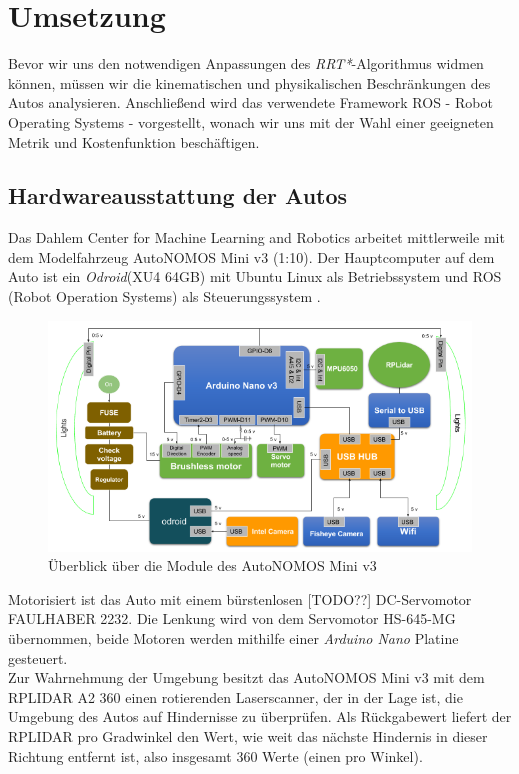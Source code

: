 \section{Umsetzung}
\label{Umsetzung}
Bevor wir uns den notwendigen Anpassungen des \textit{RRT*}-Algorithmus widmen können, müssen wir die kinematischen und physikalischen Beschränkungen des Autos analysieren. Anschließend wird das verwendete Framework ROS - Robot Operating Systems - vorgestellt, wonach wir uns mit der Wahl einer geeigneten Metrik und Kostenfunktion beschäftigen.
\subsection{Hardwareausstattung der Autos}
Das Dahlem Center for Machine Learning and Robotics arbeitet mittlerweile mit dem Modelfahrzeug AutoNOMOS Mini v3 (1:10). Der Hauptcomputer auf dem Auto ist ein \textit{Odroid}(XU4 64GB) mit Ubuntu Linux als Betriebssystem und ROS (Robot Operation Systems) als Steuerungssystem \citep{fubAuto}.\\
\begin{figure}
\centering
\includegraphics[scale=0.8]{Bilder/AutoNOMOS_mini_v3.png} 
\caption{Überblick über die Module des AutoNOMOS Mini v3}
\end{figure}
Motorisiert ist das Auto mit einem bürstenlosen [TODO??] DC-Servomotor FAULHABER 2232. Die Lenkung wird von dem Servomotor HS-645-MG übernommen, beide Motoren werden mithilfe einer \textit{Arduino Nano} Platine gesteuert. \\
Zur Wahrnehmung der Umgebung besitzt das AutoNOMOS Mini v3 mit dem RPLIDAR A2 360 einen rotierenden Laserscanner, der in der Lage ist, die Umgebung des Autos auf Hindernisse zu überprüfen. Als Rückgabewert liefert der RPLIDAR pro Gradwinkel den Wert, wie weit das nächste Hindernis in dieser Richtung entfernt ist, also insgesamt 360 Werte (einen pro Winkel). \\
